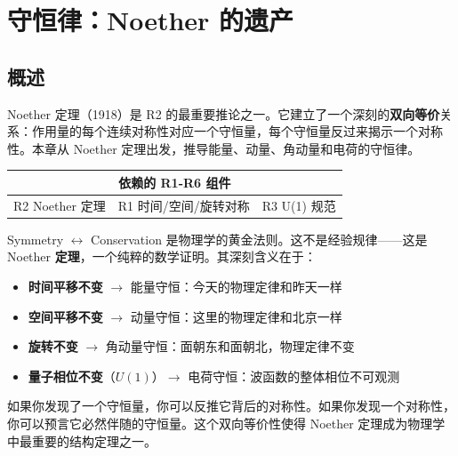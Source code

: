 \chapter{守恒律：Noether 的遗产}
\label{ch:conservation}

\section{概述}

Noether 定理（1918）是 R2 的最重要推论之一。它建立了一个深刻的\textbf{双向等价}关系：作用量的每个连续对称性对应一个守恒量，每个守恒量反过来揭示一个对称性。本章从 Noether 定理出发，推导能量、动量、角动量和电荷的守恒律。

\begin{center}
\small
\begin{tabular}{p{3.5cm}p{3.5cm}p{3cm}}
\toprule
\multicolumn{3}{c}{\textbf{依赖的 R1-R6 组件}} \\
\midrule
R2 Noether 定理 & R1 时间/空间/旋转对称 & R3 U(1) 规范 \\
\bottomrule
\end{tabular}
\end{center}

\begin{insightbox}
  Symmetry $\leftrightarrow$ Conservation 是物理学的黄金法则。这不是经验规律——这是 Noether \textbf{定理}，一个纯粹的数学证明。其深刻含义在于：

  \begin{itemize}
    \item \textbf{时间平移不变} $\to$ 能量守恒：今天的物理定律和昨天一样
    \item \textbf{空间平移不变} $\to$ 动量守恒：这里的物理定律和北京一样
    \item \textbf{旋转不变} $\to$ 角动量守恒：面朝东和面朝北，物理定律不变
    \item \textbf{量子相位不变}（$U(1)$）$\to$ 电荷守恒：波函数的整体相位不可观测
  \end{itemize}

  如果你发现了一个守恒量，你可以反推它背后的对称性。如果你发现一个对称性，你可以预言它必然伴随的守恒量。这个双向等价性使得 Noether 定理成为物理学中最重要的结构定理之一。
\end{insightbox}

